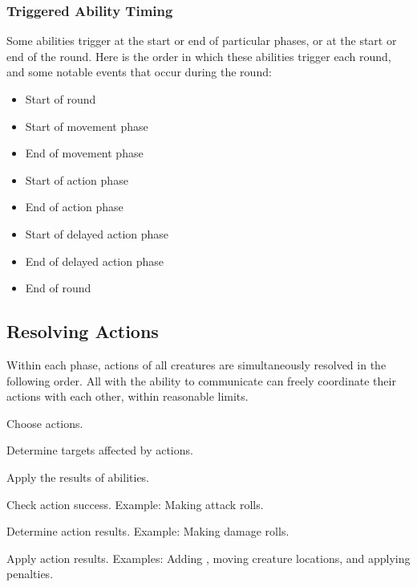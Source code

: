         \subsubsection{Triggered Ability Timing}\label{Triggered Ability Timing}
            Some abilities trigger at the start or end of particular phases, or at the start or end of the round.
            Here is the order in which these abilities trigger each round, and some notable events that occur during the round:
            \begin{itemize}
                \item Start of round
                \item Start of movement phase
                \item End of movement phase
                \item Start of action phase
                \item End of action phase
                \item Start of delayed action phase
                \item End of delayed action phase
                \item End of round
            \end{itemize}

    \subsection{Resolving Actions}\label{Resolving Actions}

        Within each phase, actions of all creatures are simultaneously resolved in the following order.
        All  with the ability to communicate can freely coordinate their actions with each other, within reasonable limits.

        \begin{enumerate*}
            \item Choose actions.
            \item Determine targets affected by actions.
            \item Apply the results of  abilities.
            \item Check action success.
                Example: Making attack rolls.
            \item Determine action results.
                Example: Making damage rolls.
            \item Apply action results.
                Examples: Adding , moving creature locations, and applying penalties.
        \end{enumerate*}

